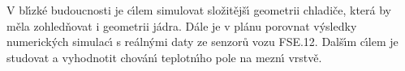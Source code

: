 V bl\'{\i}zk\'{e} budoucnosti je c\'{\i}lem simulovat slo\v{z}it\v{e}j\v{s}\'{\i} geometrii chladi\v{c}e, kter\'{a} by m\v{e}la zohled\v{n}ovat i geometrii j\'{a}dra. D\'{a}le je v pl\'{a}nu porovnat v\'{y}sledky numerick\'{y}ch simulac\'{\i} s re\'{a}ln\'{y}mi daty ze senzor\r{u} vozu FSE.12. Dal\v{s}\'{\i}m c\'{\i}lem je studovat a vyhodnotit chov\'{a}n\'{\i} teplotn\'{\i}ho pole na mezn\'{\i} vrstv\v{e}.






